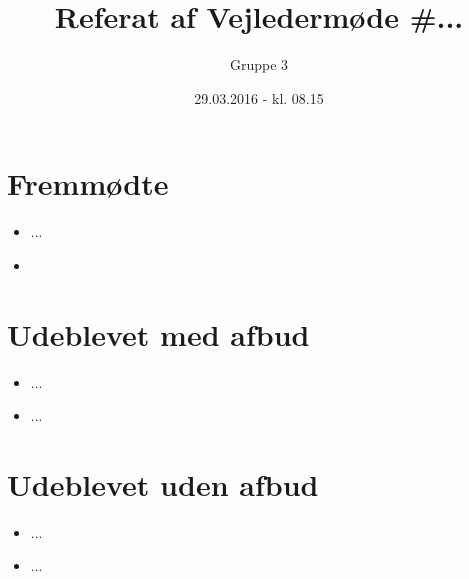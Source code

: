\documentclass{article}
\title{Referat af Vejledermøde \#...}
\author{Gruppe 3}
\date{29.03.2016 - kl. 08.15}
\begin{document}
	\maketitle
	
	\section{Fremmødte}
	\begin{itemize}
		\item ...
		\item 
	\end{itemize}
	
	\section{Udeblevet med afbud}
	\begin{itemize}
		\item ...
		\item ...
	\end{itemize}
	
	\section{Udeblevet uden afbud}
	\begin{itemize}
		\item ...
		\item ...
	\end{itemize}
	
\end{document}
